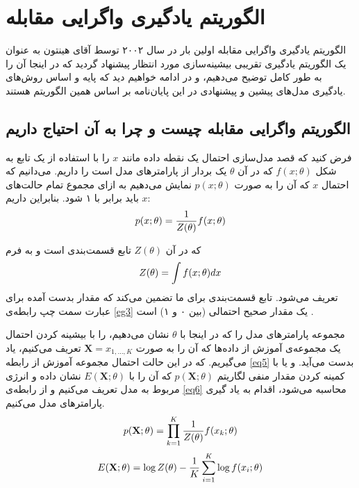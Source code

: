 \section{الگوریتم یادگیری واگرایی مقابله}
\label{chap2sec7}
الگوریتم یادگیری واگرایی مقابله
 اولین بار در سال ۲۰۰۲ توسط آقای هینتون
\cite{hinton2002training}
به عنوان یک الگوریتم یادگیری تقریبی بیشینه‌سازی مورد انتظار
پیشنهاد گردید که در اینجا آن را به طور کامل توضیح می‌‌دهیم، و در ادامه خواهیم دید که پایه و اساس روش‌های یادگیری مدل‌های پیشین و پیشنهادی در این پایان‌‌نامه بر اساس همین الگوریتم هستند.

\subsection{الگوریتم واگرایی مقابله چیست و چرا به آن احتیاج داریم}
\label{chap2sec7sub1}

فرض کنید که قصد مدل‌سازی احتمال یک نقطه داده
 مانند
$x$
را با استفاده از یک تابع به شکل
$f(x;\theta)$
که در آن
$\theta$
یک بردار از پارامتر‌های مدل است را داریم. می‌‌دانیم که احتمال
$x$
که آن را به صورت
$p(x;\theta)$
نمایش می‌‌دهیم به ازای مجموع تمام حالت‌های
$x$
باید برابر با ۱ شود. بنابراین داریم:
\begin{align}
\centering
p(x;\theta) = \dfrac{1}{Z(\theta)}f(x;\theta)
\label{eg3}
\end{align}

که در آن
$Z(\theta)$
تابع قسمت‌بندی
 است و به فرم
\begin{align}
\centering
Z(\theta) = \int f(x;\theta)dx
\label{eg4}
\end{align}
تعریف می‌شود. تابع قسمت‌بندی برای ما تضمین می‌‌کند که مقدار بدست آمده برای عبارت سمت چپ رابطه‌ی
\ref{eg3}
یک مقدار صحیح احتمالی‌ (بین ۰ و ۱) است
\cite{woodfordnotes}.

مجموعه پارامتر‌های مدل را که در اینجا با
$\theta$
نشان می‌‌دهیم، را با بیشینه کردن احتمال یک مجموعه‌‌ی آموزش
 از داده‌ها که آن را به صورت
$\textbf{X} = x_{1,...,K}$
تعریف می‌‌کنیم، یاد می‌‌گیریم. که در این حالت احتمال مجموعه آموزش از رابطه
\ref{eq5}
بدست می‌‌آید. و یا با کمینه کردن مقدار منفی لگاریتم
$p(\textbf{X};\theta)$
که آن را با
$E(\textbf{X};\theta)$
نشان داده و انرژی مربوط به مدل تعریف می‌کنیم و از رابطه‌ی 
\ref{eq6}
محاسبه می‌شود، اقدام به یاد گیری پارامتر‌های مدل می‌‌کنیم.
\begin{align}
\centering
p(\textbf{X};\theta) = \prod_{k=1}^{K} \frac{1}{Z(\theta)} f(x_k;\theta)
\label{eq5}
\end{align}
\begin{align}
\centering
E(\textbf{X};\theta) = \log Z(\theta) - \dfrac{1}{K} \sum_{i=1}^{K} \log f(x_i;\theta)
\label{eq6}
\end{align}

